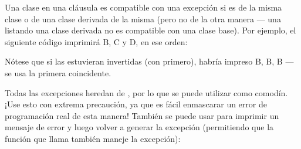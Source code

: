 \documentclass[a5paper,10pt,spanish]{sphinxmanual}
\begin{document}
\sphinxAtStartPar
Una clase en una cláusula  es compatible con una excepción si es de la misma clase o de una clase derivada de la misma (pero no de la otra manera — una  listando una clase derivada no es compatible con una clase base). Por ejemplo, el siguiente código imprimirá B, C y D, en ese orden:

\begin{sphinxVerbatim}[commandchars=\\\{\}]
 

 

 

   \PYG{p}{[}  \PYG{p}{]}
         
     
     
     
\end{sphinxVerbatim}

\sphinxAtStartPar
Nótese que si las  estuvieran invertidas (con  primero), habría impreso B, B, B — se usa la primera  coincidente.

\sphinxAtStartPar
Todas las excepciones heredan de , por lo que se puede utilizar como comodín. ¡Use esto con extrema precaución, ya que es fácil enmascarar un error de programación real de esta manera! También se puede usar para imprimir un mensaje de error y luego volver a generar la excepción (permitiendo que la función que llama también maneje la excepción):
\end{document}
